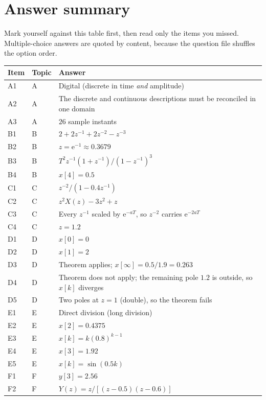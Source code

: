 \documentclass[10pt]{article}
\newcommand{\e}{\mathrm{e}}
\begin{document}
\section*{Answer summary}

Mark yourself against this table first, then read only the items you missed.
Multiple-choice answers are quoted by content, because the question file shuffles
the option order.

\begin{longtable}{@{}llp{95mm}@{}}
\toprule
Item & Topic & Answer \\
\midrule
\endhead
A1 & A & Digital (discrete in time \emph{and} amplitude) \\
A2 & A & The discrete and continuous descriptions must be reconciled in one domain \\
A3 & A & \(26\) sample instants \\
\midrule
B1 & B & \(2+2z^{-1}+2z^{-2}-z^{-3}\) \\
B2 & B & \(z=\e^{-1}\approx 0.3679\) \\
B3 & B & \(T^{2}z^{-1}(1+z^{-1})/(1-z^{-1})^{3}\) \\
B4 & B & \(x[4]=0.5\) \\
\midrule
C1 & C & \(z^{-2}/(1-0.4z^{-1})\) \\
C2 & C & \(z^{2}X(z)-3z^{2}+z\) \\
C3 & C & Every \(z^{-1}\) scaled by \(\e^{-aT}\), so \(z^{-2}\) carries \(\e^{-2aT}\) \\
C4 & C & \(z=1.2\) \\
\midrule
D1 & D & \(x[0]=0\) \\
D2 & D & \(x[1]=2\) \\
D3 & D & Theorem applies; \(x[\infty]=0.5/1.9=0.263\) \\
D4 & D & Theorem does not apply; the remaining pole \(1.2\) is outside, so \(x[k]\) diverges \\
D5 & D & Two poles at \(z=1\) (double), so the theorem fails \\
\midrule
E1 & E & Direct division (long division) \\
E2 & E & \(x[2]=0.4375\) \\
E3 & E & \(x[k]=k(0.8)^{k-1}\) \\
E4 & E & \(x[3]=1.92\) \\
E5 & E & \(x[k]=\sin(0.5k)\) \\
\midrule
F1 & F & \(y[3]=2.56\) \\
F2 & F & \(Y(z)=z/[(z-0.5)(z-0.6)]\) \\

\end{longtable}
\end{document}
